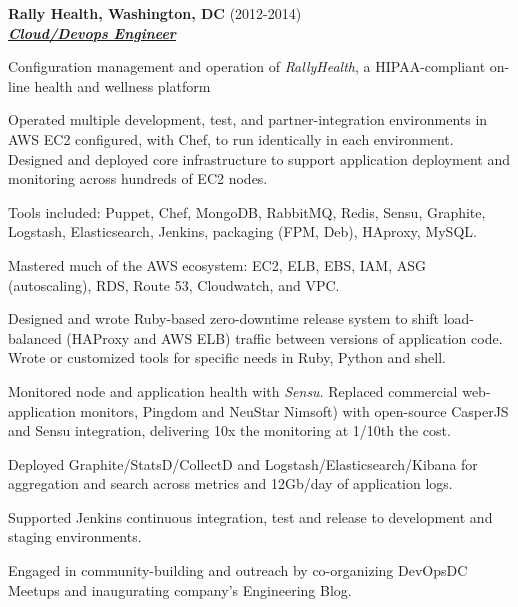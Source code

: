 \documentclass{article}
\newcommand{\employer}[3]{{ \textbf{#1} (#2)\\ \underline{\textbf{\emph{#3}}}\\ \nopagebreak }}
\newenvironment{achievements}{\begin{list}{\topsep 0pt \itemsep -2pt}} {\vspace*{4pt}\end{list}}
\begin{document}
\employer{Rally Health, Washington, DC}{2012-2014}{Cloud/Devops Engineer}
\begin{achievements}
  \item Configuration management and operation of \emph{RallyHealth}, a HIPAA-compliant on-line health and wellness platform
  \item Operated multiple development, test, and partner-integration environments in AWS EC2 configured, with Chef, to run identically in each environment. Designed and deployed core infrastructure to support application deployment and monitoring across hundreds of EC2 nodes.
  \item Tools included: Puppet, Chef, MongoDB, RabbitMQ, Redis, Sensu, Graphite, Logstash, Elasticsearch, Jenkins, packaging (FPM, Deb), HAproxy, MySQL.
  \item Mastered much of the AWS ecosystem: EC2, ELB, EBS, IAM, ASG (autoscaling), RDS, Route 53, Cloudwatch, and VPC.
  \item Designed and wrote Ruby-based zero-downtime release system to shift load-balanced (HAProxy and AWS ELB) traffic between versions of application code. Wrote or customized tools for specific needs in Ruby, Python and shell.
  \item Monitored node and application health with \emph{Sensu}. Replaced commercial web-application monitors, Pingdom and NeuStar Nimsoft) with open-source CasperJS and Sensu integration, delivering 10x the monitoring at 1/10th the cost.
  \item Deployed Graphite/StatsD/CollectD and Logstash/Elasticsearch/Kibana for aggregation and search across metrics and 12Gb/day of application logs.
  \item Supported Jenkins continuous integration, test and release to development and staging environments.
  \item Engaged in community-building and outreach by co-organizing DevOpsDC Meetups and inaugurating company's Engineering Blog.
\end{achievements}
\end{document}
